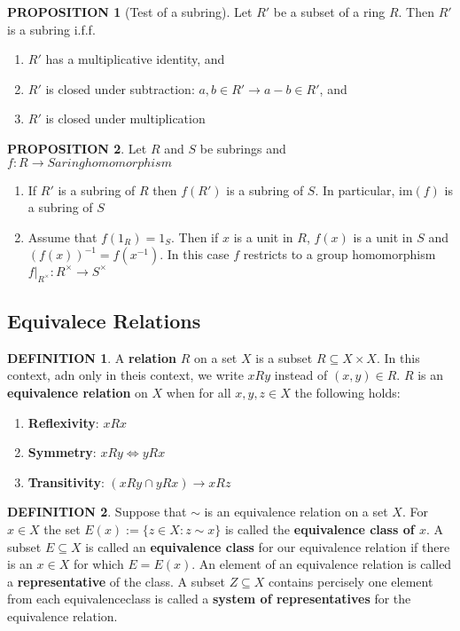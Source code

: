 \documentclass[10pt]{article}
\theoremstyle{definition}
\newtheorem{definition}{DEFINITION}[subsection]
\newtheorem{prop}{PROPOSITION}[subsection]
\begin{document}
\begin{prop}[Test of a subring]
    Let $R'$ be a subset of a ring $R$. Then $R'$ is a subring i.f.f.
    \begin{enumerate}
        \item $R'$ has a multiplicative identity, and
        \item $R'$ is closed under subtraction: $a,b\in R' \rightarrow a-b\in R'$, and
        \item $R'$ is closed under multiplication
    \end{enumerate}
\end{prop}

\begin{prop}
    Let $R$ and $S$ be subrings and $f:R\rightarrow S a ring homomorphism$
    \begin{enumerate}
        \item If $R'$ is a subring of $R$ then $f(R')$ is a subring of $S$. In particular, $\text{im}(f)$ is a subring of $S$
        \item Assume that $f(1_R) = 1_S$. Then if $x$ is a unit in  $R$, $f(x)$ is a unit in $S$ and $(f(x))^{-1} = f(x^{-1})$. In this case $f$ restricts to a group homomorphism $f|_{R^\times}:R^\times \rightarrow S^\times$
    \end{enumerate}
\end{prop}

\subsection{Equivalece Relations}
\begin{definition}
    A \textbf{relation} $R$ on a set $X$ is a subset $R \subseteq X \times X$. In this context, adn only in theis context, we write $xRy$ instead of $(x,y) \in R$. $R$ is an \textbf{equivalence relation} on $X$ when for all $x,y,z \in X$ the following holds:
    \begin{enumerate}
        \item \textbf{Reflexivity}: $xRx$
        \item \textbf{Symmetry}: $xRy \Leftrightarrow yRx$
        \item \textbf{Transitivity}: $(xRy \cap yRx) \rightarrow xRz$
    \end{enumerate}
\end{definition}

\begin{definition}
    Suppose that $\sim$ is an equivalence relation on a set $X$. For $x \in X$ the set $E(x) := \{z \in X: z \sim x\}$ is called the \textbf{equivalence class of $x$}. A subset $E \subseteq X$ is called an \textbf{equivalence class} for our equivalence relation if there is an $x \in X$ for which $E = E(x)$. An element of an equivalence relation is called a \textbf{representative} of the class. A subset $Z \subseteq X$ contains percisely one element from each equivalenceclass is called a \textbf{system of representatives} for the equivalence relation.
\end{definition}
\end{document}
